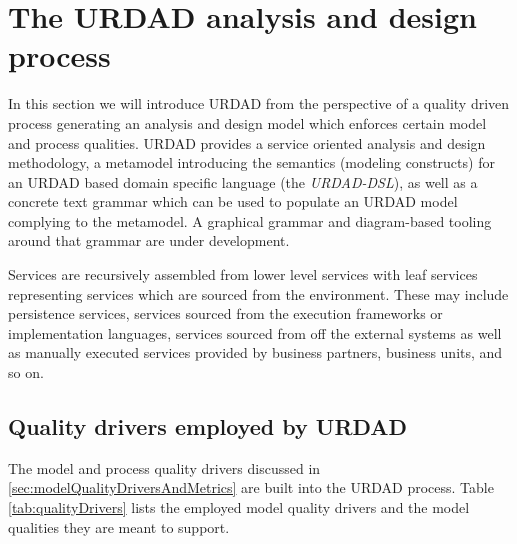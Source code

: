 \section{The URDAD analysis and design process}

In this section we will introduce URDAD from the perspective of a quality driven process generating an analysis and design model which enforces certain model and process qualities.  URDAD\cite{solms_generating_2009} provides a service oriented analysis and design methodology, a metamodel introducing the semantics (modeling constructs) for an URDAD based domain specific language (the \emph{URDAD-DSL}), as well as a concrete text grammar which can be used to populate an URDAD model complying to the metamodel. A graphical grammar and diagram-based tooling around that grammar are under development. 

Services are recursively assembled from lower level services with leaf services representing services which are sourced from the environment. These may include persistence services, services sourced from the execution frameworks or implementation languages, services sourced from off the external systems as well as manually executed services provided by business partners, business units, and so on.


\subsection{Quality drivers employed by URDAD}

The model and process quality drivers discussed in \ref{sec:modelQualityDriversAndMetrics} are built into the URDAD process. Table \ref{tab:qualityDrivers} lists the employed model quality drivers and the model qualities they are meant to support.

